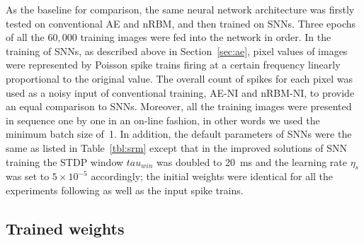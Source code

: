 As the baseline for comparison, the same neural network architecture was firstly tested on conventional AE and nRBM, and then trained on SNNs.
Three epochs of all the $60,000$ training images were fed into the network in order.
In the training of SNNs, as described above in Section~\ref{sec:ae}, pixel values of images were represented by Poisson spike trains firing at a certain frequency linearly proportional to the original value.
The overall count of spikes for each pixel was used as a noisy input of conventional training, AE-NI and nRBM-NI, to provide an equal comparison to SNNs.
Moreover, all the training images were presented in sequence one by one in an on-line fashion, in other words we used the minimum batch size of~1.
In addition, the default parameters of SNNs were the same as listed in Table~\ref{tbl:srm} except that in the improved solutions of SNN training the STDP window $tau_{win}$ was doubled to 20~ms and the learning rate $\eta_s$ was set to $5 \times 10^{-5}$ accordingly;
the initial weights were identical for all the experiments following as well as the input spike trains.


\subsection{Trained weights}

